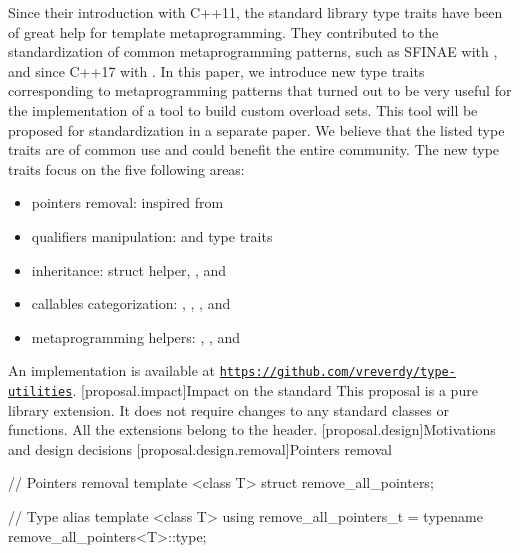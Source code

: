 \documentclass[ebook,10pt,oneside,openany,final]{memoir}
\begin{document}
Since their introduction with C++11, the standard library type traits have been of great help for template metaprogramming. They contributed to the standardization of common metaprogramming patterns, such as SFINAE with , and since C++17 with . In this paper, we introduce new type traits corresponding to metaprogramming patterns that turned out to be very useful for the implementation of a tool to build custom overload sets. This tool will be proposed for standardization in a separate paper. We believe that the listed type traits are of common use and could benefit the entire community. The new type traits focus on the five following areas:
\begin{itemize}
\item pointers removal:  inspired from 
\item qualifiers manipulation:  and  type traits
\item inheritance:  struct helper, ,  and 
\item callables categorization: , , ,  and 
\item metaprogramming helpers: , ,  and 
\end{itemize}

An implementation is available at \href{https://github.com/vreverdy/type-utilities}{\texttt{https://github.com/vreverdy/type-utilities}}.
[proposal.impact]{Impact on the standard}
This proposal is a pure library extension. It does not require changes to any standard classes or functions. All the extensions belong to the  header.
[proposal.design]{Motivations and design decisions}
[proposal.design.removal]{Pointers removal}

\begin{codeblock}
// Pointers removal
template <class T> struct remove_all_pointers;

// Type alias
template <class T> using remove_all_pointers_t = typename remove_all_pointers<T>::type;
\end{codeblock}
\end{document}

